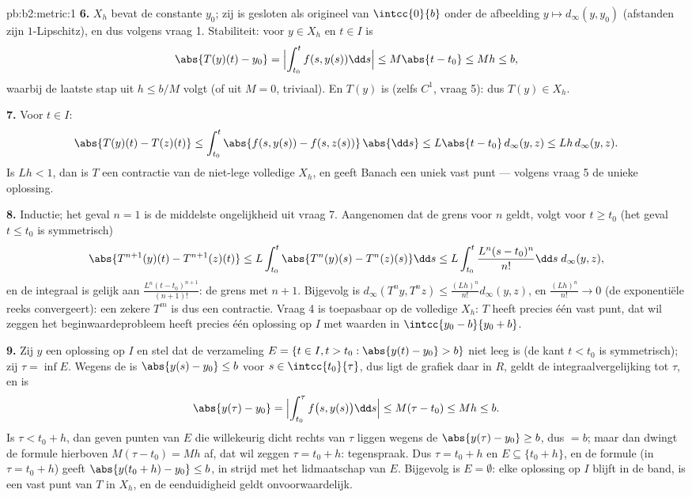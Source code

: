 \begin{solution}{pb:b2:metric:1}
\textbf{6.} $X_h$ bevat de constante $y_0$; zij is gesloten als
origineel van $\intcc{0}{b}$ onder de  afbeelding $y
\mapsto d_\infty(y, y_0)$ (afstanden zijn $1$-Lipschitz), en dus
 volgens vraag 1. Stabiliteit: voor $y \in X_h$ en $t \in
I$ is
\[
\abs{T(y)(t) - y_0} = \Bigl|\int_{t_0}^{t}f(s, y(s))\dd s\Bigr|
\leq M\abs{t - t_0} \leq Mh \leq b ,
\]
waarbij de laatste stap uit $h \leq b/M$ volgt (of uit $M = 0$,
triviaal). En $T(y)$ is  (zelfs $C^1$, vraag 5): dus $T(y)
\in X_h$.

\textbf{7.} Voor $t \in I$:
\[
\abs{T(y)(t) - T(z)(t)} \leq \int_{t_0}^{t}\abs{f(s, y(s)) -
f(s, z(s))}\,\abs{\dd s} \leq L\abs{t - t_0}\,d_\infty(y,z)
\leq Lh\,d_\infty(y,z).
\]
Is $Lh < 1$, dan is $T$ een contractie van de niet-lege volledige
$X_h$, en geeft Banach een uniek vast punt --- volgens vraag 5 de
unieke oplossing.

\textbf{8.} Inductie; het geval $n = 1$ is de middelste
ongelijkheid uit vraag 7. Aangenomen dat de grens voor $n$ geldt,
volgt voor $t \geq t_0$ (het geval $t \leq t_0$ is symmetrisch)
\[
\abs{T^{n+1}(y)(t) - T^{n+1}(z)(t)}
\leq L\int_{t_0}^{t}\abs{T^n(y)(s) - T^n(z)(s)}\dd s
\leq L\int_{t_0}^{t}\frac{L^n(s - t_0)^n}{n!}\dd s\;
d_\infty(y,z),
\]
en de integraal is gelijk aan $\frac{L^n(t - t_0)^{n+1}}{(n+1)!}$:
de grens met $n + 1$. Bijgevolg is $d_\infty(T^n y, T^n z) \leq
\frac{(Lh)^n}{n!}d_\infty(y, z)$, en $\frac{(Lh)^n}{n!} \to 0$ (de
exponentiële reeks convergeert): een zekere $T^m$ is dus een
contractie. Vraag 4 is toepasbaar op de volledige $X_h$: $T$ heeft
precies één vast punt, dat wil zeggen het beginwaardeprobleem heeft
precies één oplossing op $I$ met waarden in $\intcc{y_0 - b}{y_0 +
b}$.

\textbf{9.} Zij $y$ een oplossing op $I$ en stel dat de verzameling
$E = \{t \in I, t > t_0 : \abs{y(t) - y_0} > b\}$ niet leeg is (de
kant $t < t_0$ is symmetrisch); zij $\tau = \inf E$. Wegens de
 is $\abs{y(s) - y_0} \leq b$ voor $s \in
\intcc{t_0}{\tau}$, dus ligt de grafiek daar in $R$, geldt de
integraalvergelijking tot $\tau$, en is
\[
\abs{y(\tau) - y_0} = \Bigl|\int_{t_0}^{\tau}f\bigl(s,
y(s)\bigr)\dd s\Bigr| \leq M(\tau - t_0) \leq Mh \leq b .
\]
Is $\tau < t_0 + h$, dan geven punten van $E$ die willekeurig dicht
rechts van $\tau$ liggen wegens de  $\abs{y(\tau) -
y_0} \geq b$, dus $= b$; maar dan dwingt de formule hierboven
$M(\tau - t_0) = Mh$ af, dat wil zeggen $\tau = t_0 + h$:
tegenspraak. Dus $\tau = t_0 + h$ en $E \subseteq \{t_0 + h\}$, en
de formule (in $\tau = t_0 + h$) geeft $\abs{y(t_0 + h) - y_0} \leq
b$, in strijd met het lidmaatschap van $E$. Bijgevolg is $E =
\emptyset$: elke oplossing op $I$ blijft in de band, is een vast
punt van $T$ in $X_h$, en de eenduidigheid geldt onvoorwaardelijk.


\end{solution}

